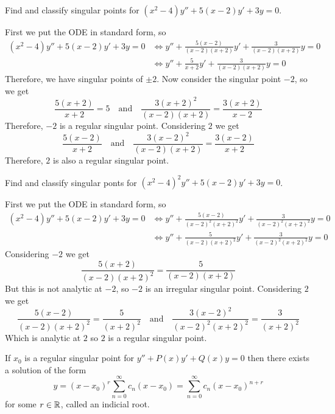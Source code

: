 \documentclass[notes]{subfiles}
\begin{document}
\begin{exercise}
    Find and classify singular points for $(x^2 - 4)y'' + 5(x - 2)y' + 3y = 0$.
\end{exercise}
\begin{solution}
    First we put the ODE in standard form, so
    \begin{align*}
        (x^2 - 4)y'' + 5(x - 2)y' + 3y = 0
        &\iff y'' + \frac{5(x - 2)}{(x - 2)(x + 2)}y' + \frac{3}{(x - 2)(x + 2)}y = 0 \\
        &\iff y'' + \frac{5}{x + 2}y' + \frac{3}{(x - 2)(x + 2)}y = 0
    \end{align*}
    Therefore, we have singular points of $\pm 2$. Now consider the singular point $-2$, so we get
    \[
        \frac{5(x + 2)}{x + 2} = 5 \quad \text{and} \quad \frac{3(x + 2)^2}{(x - 2)(x + 2)} = \frac{3(x + 2)}{x - 2}
    \]
    Therefore, $-2$ is a regular singular point.
    Considering $2$ we get
    \[
        \frac{5(x - 2)}{x + 2} \quad \text{and} \quad \frac{3(x - 2)^2}{(x - 2)(x + 2)} = \frac{3(x - 2)}{x + 2}
    \]
    Therefore, $2$ is also a regular singular point.
\end{solution}

\begin{exercise}
    Find and classify singular ponts for $(x^2 - 4)^2y'' + 5(x - 2)y' + 3y = 0$.
\end{exercise}
\begin{solution}
    First we put the ODE in standard form, so
    \begin{align*}
        (x^2 - 4)y'' + 5(x - 2)y' + 3y = 0
        &\iff y'' + \frac{5(x - 2)}{(x - 2)^2(x + 2)^2}y' + \frac{3}{(x - 2)^2(x + 2)^2}y = 0 \\
        &\iff y'' + \frac{5}{(x - 2)(x + 2)^2}y' + \frac{3}{(x - 2)^2(x + 2)^2}y = 0
    \end{align*}
    Considering $-2$ we get
    \[
        \frac{5(x + 2)}{(x - 2)(x + 2)^2} = \frac{5}{(x - 2)(x + 2)}
    \]
    But this is not analytic at $-2$, so $-2$ is an irregular singular point.
    Considering $2$ we get
    \[
        \frac{5(x - 2)}{(x - 2)(x + 2)^2} = \frac{5}{(x + 2)^2} \quad \text{and} \quad \frac{3(x - 2)^2}{(x - 2)^2(x + 2)^2} = \frac{3}{(x + 2)^2}
    \]
    Which is analytic at $2$ so $2$ is a regular singular point.
\end{solution}

\begin{theorem}
    If $x_0$ is a regular singular point for $y'' + P(x)y' + Q(x)y = 0$ then there exists a solution of the form
    \[
        y = (x - x_0)^r \sum_{n = 0}^\infty c_n(x - x_0) = \sum_{n = 0}^\infty c_n(x - x_0)^{n + r}
    \]
    for some $r \in \mathbb{R}$, called an indicial root.
\end{theorem}
\end{document}
